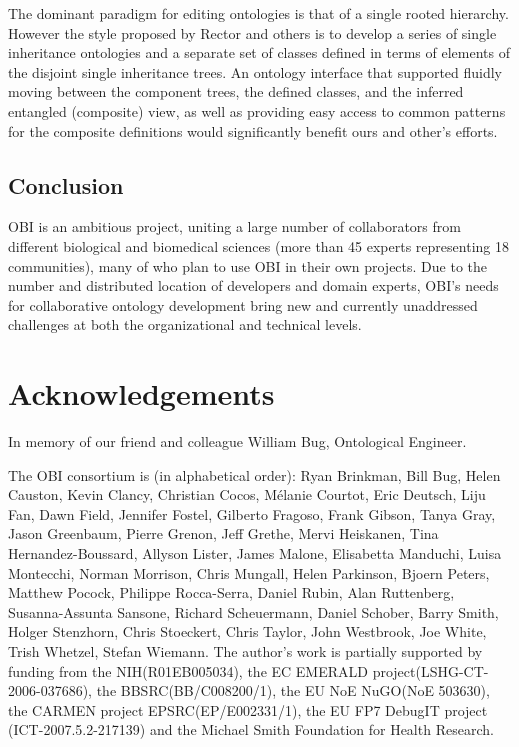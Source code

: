 \documentclass{elsart}       %
\begin{document}
The dominant paradigm for editing ontologies is that of a single rooted hierarchy.
However the style proposed by Rector and others is to develop a series of single inheritance ontologies and a separate set of classes defined in terms of elements of the disjoint single inheritance trees.
An ontology interface that supported fluidly moving between the component trees, the defined classes, and the inferred entangled (composite) view, as well as providing easy access to common patterns for the composite definitions would significantly benefit ours and other’s efforts.

\subsection{Conclusion}
OBI is an ambitious project, uniting a large number of collaborators from different biological and biomedical sciences (more than 45 experts representing 18 communities), many of who plan to use OBI in their own projects.
Due to the number and distributed location of developers and domain experts, OBI’s needs for collaborative ontology development bring new and currently unaddressed challenges at both the organizational and technical levels.



\section{Acknowledgements}

In memory of our friend and colleague William Bug, Ontological Engineer. 

The OBI consortium is (in alphabetical order): Ryan Brinkman, Bill Bug, Helen Causton, Kevin Clancy, Christian Cocos, M\'elanie Courtot, Eric Deutsch, Liju Fan, Dawn Field, Jennifer Fostel, Gilberto Fragoso, Frank Gibson, Tanya Gray, Jason Greenbaum, Pierre Grenon, Jeff Grethe, Mervi Heiskanen, Tina Hernandez-Boussard, Allyson Lister, James Malone, Elisabetta Manduchi, Luisa Montecchi, Norman Morrison, Chris Mungall, Helen Parkinson, Bjoern Peters, Matthew Pocock, Philippe Rocca-Serra, Daniel Rubin, Alan Ruttenberg, Susanna-Assunta Sansone, Richard Scheuermann, Daniel Schober, Barry Smith, Holger Stenzhorn, Chris Stoeckert, Chris Taylor, John Westbrook,  Joe White, Trish Whetzel, Stefan Wiemann. The author’s work is partially supported by funding from the NIH(R01EB005034), the EC EMERALD project(LSHG-CT-2006-037686), the BBSRC(BB/C008200/1), the EU NoE NuGO(NoE 503630), the CARMEN project EPSRC(EP/E002331/1), the EU FP7 DebugIT project (ICT-2007.5.2-217139) and the Michael Smith Foundation for Health Research.





\end{document}
